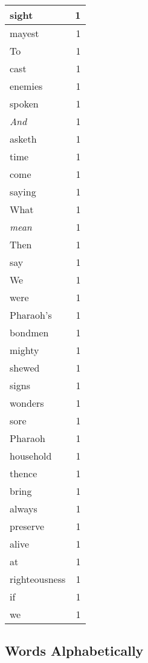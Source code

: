 \begin{center}
\begin{longtable}{l|r}
sight & 1 \\ \hline
mayest & 1 \\ \hline
To & 1 \\ \hline
cast & 1 \\ \hline
enemies & 1 \\ \hline
spoken & 1 \\ \hline
\emph{And} & 1 \\ \hline
asketh & 1 \\ \hline
time & 1 \\ \hline
come & 1 \\ \hline
saying & 1 \\ \hline
What & 1 \\ \hline
\emph{mean} & 1 \\ \hline
Then & 1 \\ \hline
say & 1 \\ \hline
We & 1 \\ \hline
were & 1 \\ \hline
Pharaoh's & 1 \\ \hline
bondmen & 1 \\ \hline
mighty & 1 \\ \hline
shewed & 1 \\ \hline
signs & 1 \\ \hline
wonders & 1 \\ \hline
sore & 1 \\ \hline
Pharaoh & 1 \\ \hline
household & 1 \\ \hline
thence & 1 \\ \hline
bring & 1 \\ \hline
always & 1 \\ \hline
preserve & 1 \\ \hline
alive & 1 \\ \hline
at & 1 \\ \hline
righteousness & 1 \\ \hline
if & 1 \\ \hline
we & 1 \\ \hline
\end{longtable}
\end{center}



\normalsize



\subsection{Words Alphabetically}

